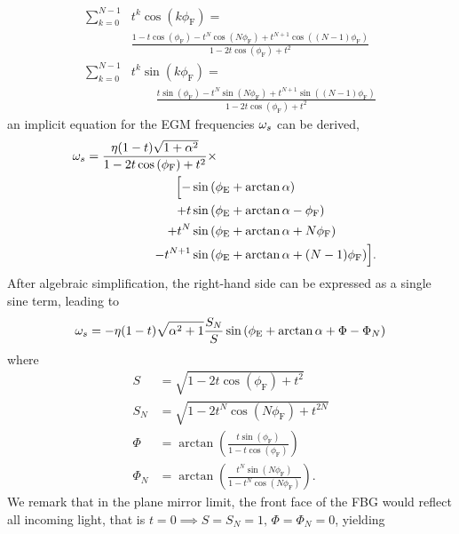 %
\begin{align*}
    \sum_{k=0}^{N-1} &t^k \cos{(k\phi_\text{F})} = \\
    &   \frac{1 - t \cos{(\phi_\text{F})} - t^N \cos{(N\phi_\text{F})} + t^{N+1} \cos{((N-1)\phi_\text{F})}}{1 - 2t \cos{(\phi_\text{F})} + t^2} \\
    \sum_{k=0}^{N-1} &t^k \sin{(k\phi_\text{F})} = \\
    &\quad \quad \frac{t \sin{(\phi_\text{F})} - t^N \sin{(N\phi_\text{F})} + t^{N+1} \sin{((N-1)\phi_\text{F})}}{1 - 2t \cos{(\phi_\text{F})} + t^2}
\end{align*}
%
an implicit equation for the EGM frequencies $\omega_s$ can be derived,
%
\begin{gather*}
    \begin{aligned}
\w_s = \frac{\eta (1-t) \sqrt{1 + \a^2}}{1 - 2 t  \cos{(\phi_\text{F})} + t^2} \times \\
&&\hspace{-6em} \Big[- &\sin{(\phi_\text{E} + \arctan\a)} \\
&&\hspace{-6em}      +  t&\sin{(\phi_\text{E} + \arctan\a - \phi_\text{F})} \\
&&\hspace{-6em}      + t^N&\sin{(\phi_\text{E} + \arctan\a + N \phi_\text{F})}   \\
&&\hspace{-6em}      -  t^{N+1}&\sin{(\phi_\text{E} + \arctan\a + (N-1) \phi_\text{F})}
\Big].
    \end{aligned}
\end{gather*}
%
After algebraic simplification, the right-hand side can be expressed as a single sine term, leading to
%
\begin{equation}
    \label{eq:discretised_ws}
    \omega_s = -\eta (1-t) \sqrt{\alpha^2+1}\frac{S_N}{S} \sin{\left( \phi_\text{E}+\arctan\alpha+ \Phi - \Phi_N  \right)}
\end{equation}
%
where
%
\begin{align}
    S &= \sqrt{1 - 2 t \cos{(\phi_\text{F})} + t^2}
    \\
    S_N &= \sqrt{1 - 2 t^N \cos{(N\phi_\text{F})} + t^{2N}}
    \\
    \Phi &= \arctan{\left( \frac{t \sin{(\phi_\text{F})}}{1 - t \cos{(\phi_\text{F})}} \right)} 
    \\
    \Phi_N &= \arctan{\left( \frac{t^N \sin{(N\phi_\text{F})}}{1 - t^N \cos{(N\phi_\text{F})}} \right)}.
\end{align}
%
We remark that in the plane mirror limit, the front face of the FBG would reflect all incoming light, that is $ t = 0 \implies S = S_N = 1, \, \Phi = \Phi_N = 0$, yielding 
